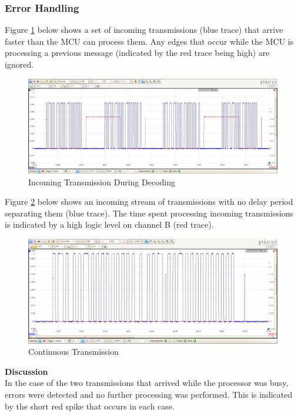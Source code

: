 \subsubsection{Error Handling}
Figure \ref{fig:transmission_too_fast} below shows a set of incoming transmissions (blue trace) that arrive faster than the MCU can process them. Any edges that occur while the MCU is processing a previous message (indicated by the red trace being high) are ignored.

\begin{figure}[H]
	\centering
	\includegraphics[width=.8\textwidth]{figures/results/receiver_software/transmission_too_fast_crop.JPG}
	\caption{Incoming Transmission During Decoding}
	\label{fig:transmission_too_fast}
\end{figure}

Figure \ref{fig:transmission_too_many_edges} below shows an incoming stream of transmissions with no delay period separating them (blue trace). The time spent processing incoming transmissions is indicated by a high logic level on channel B (red trace).

\begin{figure}[H]
	\centering
	\includegraphics[width=.8\textwidth]{figures/results/receiver_software/transmission_too_many_edges_crop.JPG}
	\caption{Continuous Transmission}
	\label{fig:transmission_too_many_edges}
\end{figure}

\textbf{Discussion}\\
In the case of the two transmissions that arrived while the processor was busy, errors were detected and no further processing was performed. This is indicated by the short red spike that occurs in each case.


